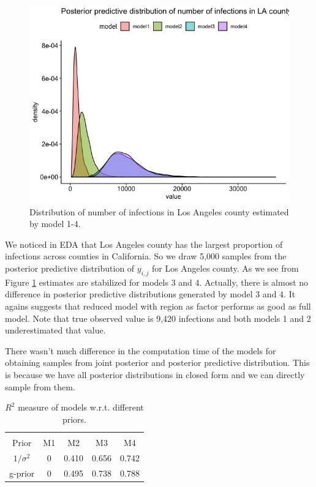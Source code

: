 \documentclass[11pt,twocolumn]{asaproc}
\begin{document}
\begin{figure}[t]
\centering\includegraphics[scale=.30]{LA.jpeg}
\caption{Distribution of number of infections in Los Angeles county estimated by model 1-4.}
\label{fig:LA}
\end{figure}



We noticed in EDA that Los Angeles county has the largest proportion of infections across counties in California. So we draw 5,000 samples from the posterior predictive distribution of $y_{i,j}$ for Los Angeles county. As we see from Figure \ref{fig:LA} estimates are stabilized for models 3 and 4. Actually, there is almost no difference in posterior predictive distributions generated by model 3 and 4. It agains suggests that reduced model with region as factor performs as good as full model. Note that true observed value is 9,420 infections and both models 1 and 2 underestimated that value. 
 

There wasn't much difference in the computation time of the models for obtaining samples from joint posterior and posterior predictive distribution. This is because we have all posterior distributions in closed form and we can directly sample from them. 


\begin{table}
\caption{$R^2$ measure of models w.r.t. different priors.}
\label{tab:infectionss}
\begin{center}
\begin{tabular}{ccccc}
\hline
\hline
\\[-5pt]
\multicolumn{1}{c}{Prior} &
\multicolumn{1}{c}{M1} &
\multicolumn{1}{c}{M2} &
\multicolumn{1}{c}{M3} &
\multicolumn{1}{c}{M4}\\
\hline
$1/\sigma^2$ &	0&   0.410 & 0.656 & 0.742\\
g-prior &	0&   0.495 & 0.738 & 0.788\\
\hline
\end{tabular}
\end{center}
\end{table}
\end{document}
